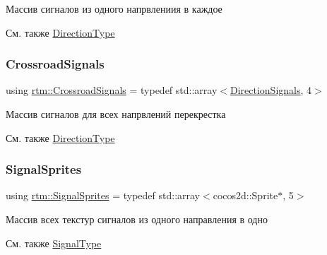 Массив сигналов из одного напрвлениия в каждое 

\begin{DoxySeeAlso}{См. также}
\hyperlink{namespacertm_a57b216f3aeb45041f3461bab08bc3aeb}{Direction\+Type} 
\end{DoxySeeAlso}
\mbox{\label{namespacertm_afa6df86cef8e2ebcc053ad994e440354}} 
\subsubsection{\texorpdfstring{Crossroad\+Signals}{CrossroadSignals}}
{\footnotesize\ttfamily using \hyperlink{namespacertm_afa6df86cef8e2ebcc053ad994e440354}{rtm\+::\+Crossroad\+Signals} = typedef std\+::array$<$\hyperlink{namespacertm_a681634e130c2137fe63a658b0e0a5e46}{Direction\+Signals}, 4$>$}



Массив сигналов для всех напрвлений перекрестка 

\begin{DoxySeeAlso}{См. также}
\hyperlink{namespacertm_a57b216f3aeb45041f3461bab08bc3aeb}{Direction\+Type} 
\end{DoxySeeAlso}
\mbox{\label{namespacertm_ab6c6acbd1378bfe5755d77179a7131ff}} 
\subsubsection{\texorpdfstring{Signal\+Sprites}{SignalSprites}}
{\footnotesize\ttfamily using \hyperlink{namespacertm_ab6c6acbd1378bfe5755d77179a7131ff}{rtm\+::\+Signal\+Sprites} = typedef std\+::array$<$cocos2d\+::\+Sprite$\ast$, 5$>$}



Массив всех текстур сигналов из одного направления в одно 

\begin{DoxySeeAlso}{См. также}
\hyperlink{namespacertm_aadb7300c15d57429546fb0b7f8ee0ee6}{Signal\+Type} 
\end{DoxySeeAlso}
\mbox{\label{namespacertm_a260109b3376dc38095724ee80ed72d8e}} 
